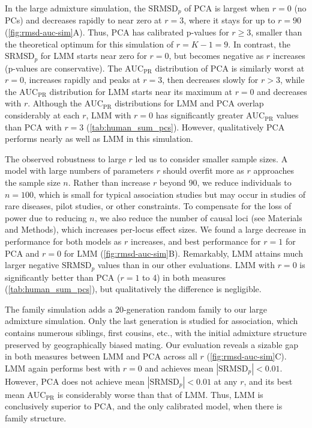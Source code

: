 \documentclass[11pt]{article}
\newcommand{\rmsd}{\text{SRMSD}_p}
\newcommand{\auc}{\text{AUC}_\text{PR}}
\begin{document}
\begin{linenumbers}
In the large admixture simulation, the $\rmsd$ of PCA is largest when $r=0$ (no PCs) and decreases rapidly to near zero at $r=3$, where it stays for up to $r=90$ (\cref{fig:rmsd-auc-sim}A).
Thus, PCA has calibrated p-values for $r \ge 3$, smaller than the theoretical optimum for this simulation of $r = K - 1 = 9$.
In contrast, the $\rmsd$ for LMM starts near zero for $r=0$, but becomes negative as $r$ increases (p-values are conservative).
The $\auc$ distribution of PCA is similarly worst at $r=0$, increases rapidly and peaks at $r = 3$, then decreases slowly for $r > 3$, while the $\auc$ distribution for LMM starts near its maximum at $r=0$ and decreases with $r$.
Although the $\auc$ distributions for LMM and PCA overlap considerably at each $r$, LMM with $r=0$ has significantly greater $\auc$ values than PCA with $r=3$ (\cref{tab:human_sum_pcs}).
However, qualitatively PCA performs nearly as well as LMM in this simulation.

The observed robustness to large $r$ led us to consider smaller sample sizes.
A model with large numbers of parameters $r$ should overfit more as $r$ approaches the sample size $n$.
Rather than increase $r$ beyond 90, we reduce individuals to $n = 100$, which is small for typical association studies but may occur in studies of rare diseases, pilot studies, or other constraints.
To compensate for the loss of power due to reducing $n$, we also reduce the number of causal loci (see Materials and Methods), which increases per-locus effect sizes.
We found a large decrease in performance for both models as $r$ increases, and best performance for $r=1$ for PCA and $r=0$ for LMM (\cref{fig:rmsd-auc-sim}B).
Remarkably, LMM attains much larger negative $\rmsd$ values than in our other evaluations.
LMM with $r=0$ is significantly better than PCA ($r=1$ to 4) in both measures (\cref{tab:human_sum_pcs}), but qualitatively the difference is negligible.

The family simulation adds a 20-generation random family to our large admixture simulation.
Only the last generation is studied for association, which contains numerous siblings, first cousins, etc., with the initial admixture structure preserved by geographically biased mating.
Our evaluation reveals a sizable gap in both measures between LMM and PCA across all $r$ (\cref{fig:rmsd-auc-sim}C).
LMM again performs best with $r=0$ and achieves mean $|\rmsd| < 0.01$.
However, PCA does not achieve mean $|\rmsd| < 0.01$ at any $r$, and its best mean $\auc$ is considerably worse than that of LMM.
Thus, LMM is conclusively superior to PCA, and the only calibrated model, when there is family structure.


\end{linenumbers}
\end{document}
